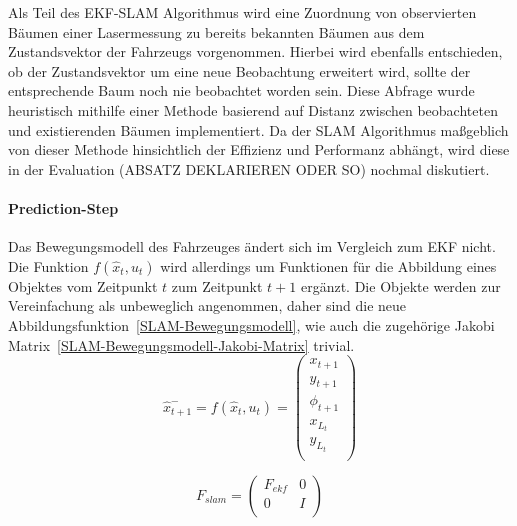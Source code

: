 \documentclass[11pt]{article}
\begin{document}
Als Teil des EKF-SLAM Algorithmus wird eine Zuordnung von observierten Bäumen einer Lasermessung zu bereits bekannten Bäumen aus dem Zustandsvektor der Fahrzeugs vorgenommen. Hierbei wird ebenfalls entschieden, ob der Zustandsvektor um eine neue Beobachtung erweitert wird, sollte der entsprechende Baum noch nie beobachtet worden sein. Diese Abfrage wurde heuristisch mithilfe einer Methode basierend auf Distanz zwischen beobachteten und existierenden Bäumen implementiert. Da der SLAM Algorithmus maßgeblich von dieser Methode hinsichtlich der Effizienz und Performanz abhängt, wird diese in der Evaluation (ABSATZ DEKLARIEREN ODER SO) nochmal diskutiert. 

\paragraph{Prediction-Step}
Das Bewegungsmodell des Fahrzeuges ändert sich im Vergleich zum EKF nicht. Die Funktion $f(\hat{x}_t, u_t)$ wird allerdings um Funktionen für die Abbildung eines Objektes vom Zeitpunkt $t$ zum Zeitpunkt $t+1$ ergänzt. Die Objekte werden zur Vereinfachung als unbeweglich angenommen, daher sind die neue Abbildungsfunktion~\ref{SLAM-Bewegungsmodell}, wie auch die zugehörige Jakobi Matrix~\eqref{SLAM-Bewegungsmodell-Jakobi-Matrix} trivial.
\begin{equation}\label{SLAM-Bewegungsmodell}
	\hat{x}_{t+1}^- = f(\hat{x}_{t},u_t) = \begin{pmatrix}
		x_{t+1} \\
		y_{t+1} \\
		\phi_{t+1} \\
		x_{L_t} \\
		y_{L_t} \\
	\end{pmatrix}
\end{equation}

\begin{equation}\label{SLAM-Bewegungsmodell-Jakobi-Matrix}
	F_{slam} = \begin{pmatrix}
		F_{ekf} & 0 \\
		0 & I \\
	\end{pmatrix}
\end{equation}
\end{document}
